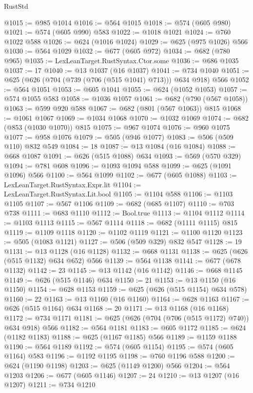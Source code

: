 \begin{lexlean}{RustStd}
\begin{coremodule}
@1015 := @985 @1014
@1016 := @564 @1015
@1018 := @574 (@605 @980)
@1021 := @574 (@605 @990) @583
@1022 := @1018 @1021
@1024 := @760 @1022 @588
@1026 := @624 (@1016 @1024)
@1029 := @625 (@975 @1026) @566
@1030 := @564 @1029
@1032 := @677 (@605 @972)
@1034 := @682 (@780 @965)
@1035 := LexLeanTarget.RustSyntax.Ctor.some
@1036 := @686 @1035
@1037 := 17
@1040 := @13 @1037 (@16 @1037)
@1041 := @734 @1040
@1051 := @625 (@626 (@704 (@739 (@706 (@515 @1041) @713))) @634 @918) @566
@1052 := @564 @1051
@1053 := @605 @1041
@1055 := @624 (@1052 @1053)
@1057 := @574 @1055 @583
@1058 := @1036 @1057
@1061 := @682 (@790 (@567 @1058))
@1063 := @599 @920 @588
@1067 := @682 (@801 (@567 @1063)) @815
@1068 := @1061 @1067
@1069 := @1034 @1068
@1070 := @1032 @1069
@1074 := @682 (@853 (@1030 @1070)) @815
@1075 := @967 @1074
@1076 := @960 @1075
@1077 := @958 @1076
@1079 := @505 (@946 @1077)
@1083 := @506 (@509 @110) @832 @549
@1084 := 18
@1087 := @13 @1084 (@16 @1084)
@1088 := @668 @1087
@1091 := @626 (@515 @1088) @634
@1093 := @569 (@570 @329)
@1094 := @781 @608
@1096 := @1093 @1094 @588
@1099 := @625 (@1091 @1096) @566
@1100 := @564 @1099
@1102 := @677 (@605 @1088)
@1103 := LexLeanTarget.RustSyntax.Expr.lit
@1104 := LexLeanTarget.RustSyntax.Lit.bool
@1105 := @1104 @588
@1106 := @1103 @1105
@1107 := @567 @1106
@1109 := @682 (@685 @1107)
@1110 := @703 @738
@1111 := @683 @1110
@1112 := Bool.true
@1113 := @1104 @1112
@1114 := @1103 @1113
@1115 := @567 @1114
@1118 := @682 (@1111 @1115) @815
@1119 := @1109 @1118
@1120 := @1102 @1119
@1121 := @1100 @1120
@1123 := @505 (@1083 @1121)
@1127 := @506 (@509 @329) @832 @547
@1128 := 19
@1131 := @13 @1128 (@16 @1128)
@1132 := @668 @1131
@1138 := @625 (@626 (@515 @1132) @634 @652) @566
@1139 := @564 @1138
@1141 := @677 (@678 @1132)
@1142 := 23
@1145 := @13 @1142 (@16 @1142)
@1146 := @668 @1145
@1149 := @626 (@515 @1146) @634
@1150 := 21
@1153 := @13 @1150 (@16 @1150)
@1154 := @628 @1153
@1159 := @625 (@626 (@515 @1154) @634 @578)
@1160 := 22
@1163 := @13 @1160 (@16 @1160)
@1164 := @628 @1163
@1167 := @626 (@515 @1164) @634
@1168 := 20
@1171 := @13 @1168 (@16 @1168)
@1172 := @734 @1171
@1181 := @625 (@626 (@704 (@706 (@515 @1172) @740)) @634 @918) @566
@1182 := @564 @1181
@1183 := @605 @1172
@1185 := @624 (@1182 @1183)
@1188 := @625 (@1167 @1185) @566
@1189 := @1159 @1188
@1190 := @564 @1189
@1192 := @574 (@605 @1154)
@1195 := @574 (@605 @1164) @583
@1196 := @1192 @1195
@1198 := @760 @1196 @588
@1200 := @624 (@1190 @1198)
@1203 := @625 (@1149 @1200) @566
@1204 := @564 @1203
@1206 := @677 (@605 @1146)
@1207 := 24
@1210 := @13 @1207 (@16 @1207)
@1211 := @734 @1210

\end{coremodule}
\end{lexlean}
